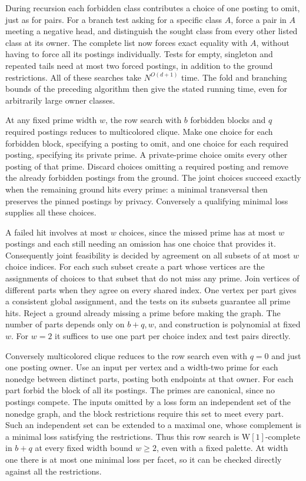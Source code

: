 During recursion each forbidden class contributes
a choice of one posting to omit, just as for pairs.
For a branch test asking for a specific class $A$,
force a pair in $A$ meeting a negative head, and
distinguish the sought class from every other
listed class at its owner. The complete list now
forces exact equality with $A$, without having to
force all its postings individually. Tests for
empty, singleton and repeated tails need at most
two forced postings, in addition to the ground
restrictions. All of these searches take
$N^{O(d+1)}$ time. The fold and branching bounds of
the preceding algorithm then give the stated
running time, even for arbitrarily large owner
classes.

At any fixed prime width $w$, the row search with
$b$ forbidden blocks and $q$ required postings
reduces to multicolored clique. Make one choice
for each forbidden block, specifying a posting to
omit, and one choice for each required posting,
specifying its private prime. A private-prime
choice omits every other posting of that prime.
Discard choices omitting a required posting and
remove the already forbidden postings from the
ground. The joint choices succeed exactly when
the remaining ground hits every prime: a minimal
transversal then preserves the pinned postings
by privacy. Conversely a qualifying minimal
loss supplies all these choices.

A failed hit involves at most $w$ choices,
since the missed prime has at most $w$ postings
and each still needing an omission has one
choice that provides it. Consequently joint
feasibility is decided by agreement on all
subsets of at most $w$ choice indices. For each
such subset create a part whose vertices are
the assignments of choices to that subset
that do not miss any prime. Join vertices of
different parts when they agree on every shared
index. One vertex per part gives a consistent
global assignment, and the tests on its
subsets guarantee all prime hits. Reject a
ground already missing a prime before making
the graph. The number of parts depends only on
$b+q,w$, and construction is polynomial at
fixed $w$. For $w=2$ it suffices to use one
part per choice index and test pairs directly.

Conversely multicolored clique reduces to the
row search even with $q=0$ and just one posting
owner. Use an input per vertex and a width-two
prime for each nonedge between distinct parts,
posting both endpoints at that owner. For each
part forbid the block of all its postings.
The primes are canonical, since no postings
compete. The inputs omitted by a loss form
an independent set of the nonedge graph, and
the block restrictions require this set to
meet every part. Such an independent set can
be extended to a maximal one, whose complement
is a minimal loss satisfying the restrictions.
Thus this row search is $\mathrm W[1]$-complete
in $b+q$ at every fixed width bound $w\ge2$,
even with a fixed palette.
At width one there is at most one minimal loss
per facet, so it can be checked directly against
all the restrictions.

